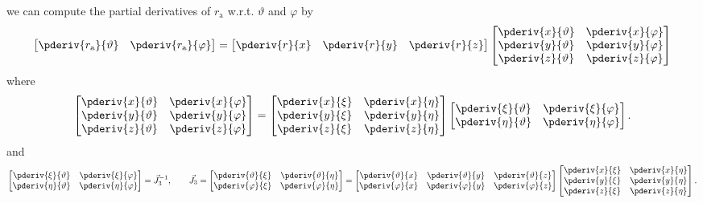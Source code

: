 we can compute the partial derivatives of $r_{\mathrm{a}}$ w.r.t. $\vartheta$ and $\varphi$ by
\begin{equation*}
	\begin{bmatrix}
		\pderiv{r_{\mathrm{a}}}{\vartheta} & \pderiv{r_{\mathrm{a}}}{\varphi}
	\end{bmatrix} = \begin{bmatrix}
		\pderiv{r}{x} & \pderiv{r}{y} & \pderiv{r}{z}
	\end{bmatrix}\begin{bmatrix}
		\pderiv{x}{\vartheta} & \pderiv{x}{\varphi}\\
		\pderiv{y}{\vartheta} & \pderiv{y}{\varphi}\\
		\pderiv{z}{\vartheta} & \pderiv{z}{\varphi}\\
	\end{bmatrix}
\end{equation*}
where
\begin{equation*}
	\begin{bmatrix}
		\pderiv{x}{\vartheta} & \pderiv{x}{\varphi}\\
		\pderiv{y}{\vartheta} & \pderiv{y}{\varphi}\\
		\pderiv{z}{\vartheta} & \pderiv{z}{\varphi}\\
	\end{bmatrix}=
	\begin{bmatrix}
		\pderiv{x}{\xi} & \pderiv{x}{\eta}\\
		\pderiv{y}{\xi} & \pderiv{y}{\eta}\\
		\pderiv{z}{\xi} & \pderiv{z}{\eta}\\
	\end{bmatrix}
	\begin{bmatrix}
		\pderiv{\xi}{\vartheta} & \pderiv{\xi}{\varphi}\\
		\pderiv{\eta}{\vartheta} & \pderiv{\eta}{\varphi}\\
	\end{bmatrix}.
\end{equation*}
and
\begin{equation*}
	\begin{bmatrix}
		\pderiv{\xi}{\vartheta} & \pderiv{\xi}{\varphi}\\
		\pderiv{\eta}{\vartheta} & \pderiv{\eta}{\varphi}\\
	\end{bmatrix}	= \vec{J}_3^{-1},\qquad \vec{J}_3 = \begin{bmatrix}
		\pderiv{\vartheta}{\xi} & \pderiv{\vartheta}{\eta}\\
		\pderiv{\varphi}{\xi}	 & \pderiv{\varphi}{\eta}
	\end{bmatrix} = \begin{bmatrix}
		\pderiv{\vartheta}{x} & \pderiv{\vartheta}{y} & \pderiv{\vartheta}{z}\\
		\pderiv{\varphi}{x} & \pderiv{\varphi}{y} & \pderiv{\varphi}{z}
	\end{bmatrix}\begin{bmatrix}
		\pderiv{x}{\xi} & \pderiv{x}{\eta}\\
		\pderiv{y}{\xi} & \pderiv{y}{\eta}\\
		\pderiv{z}{\xi} & \pderiv{z}{\eta}
	\end{bmatrix}.
\end{equation*}
